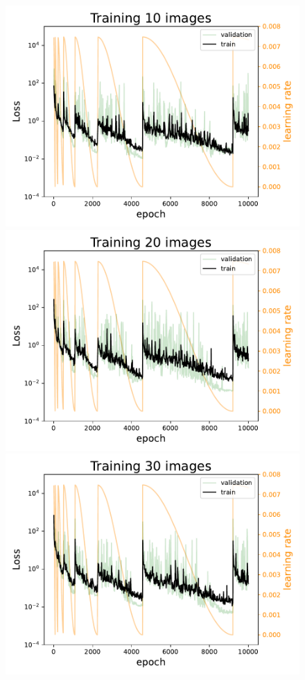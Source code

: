 \begin{figure}
    \centering
    \includegraphics[]{skinstression/images/training/Training_10_images.pdf} \\
    \includegraphics[]{skinstression/images/training/Training_20_images.pdf} \\
    \includegraphics[]{skinstression/images/training/Training_30_images.pdf}

\end{figure}
